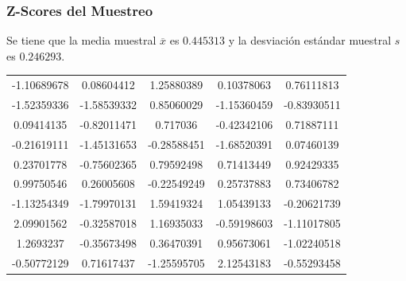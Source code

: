 \documentclass[12pt,a4paper]{article}
\begin{document}
    \subsubsection{Z-Scores del Muestreo}
        Se tiene que la media muestral $\overline{x}$ es $0.445313$ y la 
        desviación estándar muestral $s$ es $0.246293$.
        \begin{center}
            \begin{tabular}{ccccc}
                -1.10689678 &  0.08604412 &  1.25880389 &  0.10378063 &  0.76111813 \\
                -1.52359336 & -1.58539332 &  0.85060029 & -1.15360459 & -0.83930511 \\
                 0.09414135 & -0.82011471 &  0.717036   & -0.42342106 &  0.71887111 \\
                -0.21619111 & -1.45131653 & -0.28588451 & -1.68520391 &  0.07460139 \\
                 0.23701778 & -0.75602365 &  0.79592498 &  0.71413449 &  0.92429335 \\
                 0.99750546 &  0.26005608 & -0.22549249 &  0.25737883 &  0.73406782 \\
                -1.13254349 & -1.79970131 &  1.59419324 &  1.05439133 & -0.20621739 \\
                 2.09901562 & -0.32587018 &  1.16935033 & -0.59198603 & -1.11017805 \\
                 1.2693237  & -0.35673498 &  0.36470391 &  0.95673061 & -1.02240518 \\
                -0.50772129 &  0.71617437 & -1.25595705 &  2.12543183 & -0.55293458 \\
            \end{tabular}
        \end{center}
\end{document}
